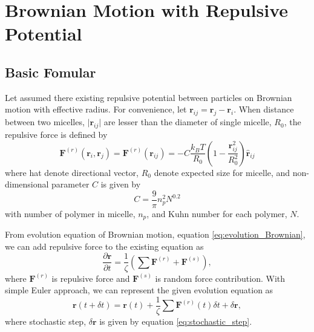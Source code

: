 \documentclass[10pt, a4paper]{report}
\begin{document}
\chapter{Brownian Motion with Repulsive Potential}
\section{Basic Fomular}
Let assumed there existing repulsive potential between particles on Brownian motion with effective radius. For convenience, let $\mathbf{r}_{ij} = \mathbf{r}_j - \mathbf{r}_i$. When distance between two micelles, $\lvert\mathbf{r}_{ij}\rvert$ are lesser than the diameter of single micelle, $R_0$, the repulsive force is defined by
\begin{equation}
\mathbf{F}^{(r)}(\mathbf{r}_i, \mathbf{r}_j) = \mathbf{F}^{(r)}(\mathbf{r}_{ij}) = -C\frac{k_BT}{R_0}\left(1 - \frac{\mathbf{r}_{ij}^2}{R_0^2}\right)\hat{\mathbf{r}}_{ij} \label{eq:force_repulsion}
\end{equation}
where hat denote directional vector, $R_0$ denote expected size for micelle, and non-dimensional parameter $C$ is given by
\begin{equation}
C = \frac{9}{\pi}n_p^2N^{0.2}
\end{equation}
with number of polymer in micelle, $n_p$, and Kuhn number for each polymer, $N$.


From evolution equation of Brownian motion, equation \eqref{eq:evolution_Brownian}, we can add repulsive force to the existing equation as
\begin{equation}
\frac{\partial \mathbf{r}}{\partial t} = \frac{1}{\zeta}\left(\sum \mathbf{F}^{(r)} + \mathbf{F}^{(s)}\right),\label{eq:evolution_Brownian_repulsion}
\end{equation}
where $\mathbf{F}^{(r)}$ is repulsive force and $\mathbf{F}^{(s)}$ is random force contribution. With simple Euler approach, we can represent the given evolution equation as
\begin{equation}
\mathbf{r}(t + \delta t) = \mathbf{r}(t) + \frac{1}{\zeta}\sum\mathbf{F}^{(r)}(t)\delta t + \delta \mathbf{r},\label{eq:update_position}
\end{equation}
where stochastic step, $\delta\mathbf{r}$ is given by equation \eqref{eq:stochastic_step}.
\end{document}
